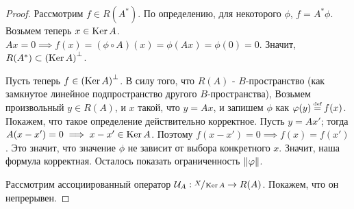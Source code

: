 \begin{proof}
    Рассмотрим $f \in R(A^*)$. По определению, для некоторого $\phi$, $f = A^*\phi$.
    Возьмем теперь $x \in \operatorname{Ker} A$. $Ax = 0 \implies f(x) = (\phi \circ A)(x) = \phi(Ax) = \phi(0) = 0$.
    Значит, $R(A^*) \subset \left( \operatorname{Ker} A\right)^\bot$.
    
    Пусть теперь $f \in \left( \operatorname{Ker} A\right)^\bot$. В силу того, что $R(A)$ - $B$-пространство
    (как замкнутое линейное подпространство другого $B$-пространства),
    Возьмем произвольный $y \in R(A)$, и $x$ такой, что $y = Ax$,
    и запишем $\phi$ как $\phi(y) \defeq f(x)$. Покажем, что такое определение
    действительно корректное.
    Пусть $y = Ax'$; тогда $A(x - x') = 0 \implies x - x' \in \operatorname{Ker} A$.
    Поэтому $f(x - x') = 0 \implies f(x) = f(x')$. Это значит, что значение $\phi$ не
    зависит от выбора конкретного $x$. Значит, наша формула корректная.
    Осталось показать ограниченность $\left\|\varphi\right\|$.

    Рассмотрим ассоциированный оператор
    $\mathcal{U}_A : \sfrac{X}{\operatorname{Ker} A} \rightarrow R(A)$.
    Покажем, что он непрерывен.


\end{proof}
